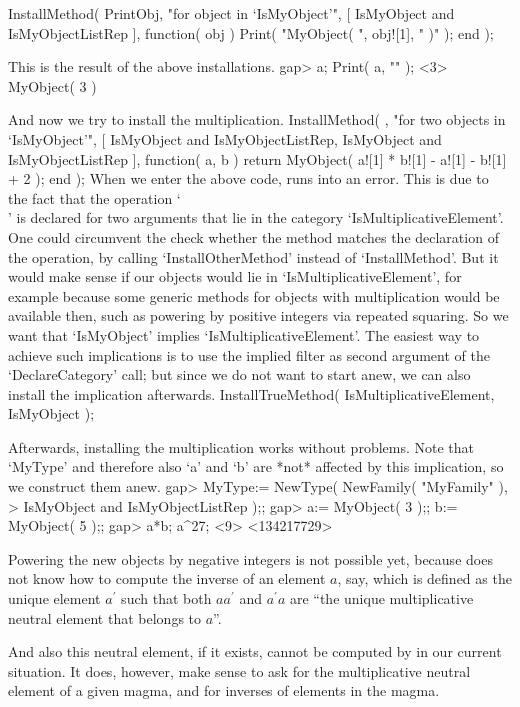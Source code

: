 InstallMethod( PrintObj,
    "for object in `IsMyObject'",
    [ IsMyObject and IsMyObjectListRep ],
    function( obj )
    Print( "MyObject( ", obj![1], " )" );
    end );
\endtt

This is the result of the above installations.
\begintt
gap> a; Print( a, "\n" );
<3>
MyObject( 3 )
\endtt

And now we try to install the multiplication.
\begintt
InstallMethod( \*,
    "for two objects in `IsMyObject'",
    [ IsMyObject and IsMyObjectListRep,
      IsMyObject and IsMyObjectListRep ],
    function( a, b )
    return MyObject( a![1] * b![1] - a![1] - b![1] + 2 );
    end );
\endtt
When we enter the above code, {\GAP} runs into an error.
This is due to the fact that the operation `\\\*' is declared for
two arguments that lie in the category `IsMultiplicativeElement'.
One could circumvent the check whether the method matches the
declaration of the operation, by calling `InstallOtherMethod'
instead of `InstallMethod'.
But it would make sense if our objects would lie in
`IsMultiplicativeElement', for example because some generic methods
for objects with multiplication would be available then,
such as powering by positive integers via repeated squaring.
So we want that `IsMyObject' implies `IsMultiplicativeElement'.
The easiest way to achieve such implications is to use the
implied filter as second argument of the `DeclareCategory' call;
but since we do not want to start anew,
we can also install the implication afterwards.
\begintt
InstallTrueMethod( IsMultiplicativeElement, IsMyObject );
\endtt

Afterwards, installing the multiplication works without problems.
Note that `MyType' and therefore also `a' and `b' are *not*
affected by this implication, so we construct them anew.
\begintt
gap> MyType:= NewType( NewFamily( "MyFamily" ),
>                      IsMyObject and IsMyObjectListRep );;
gap> a:= MyObject( 3 );;  b:= MyObject( 5 );;
gap> a*b;  a^27;
<9>
<134217729>
\endtt

Powering the new objects by negative integers is not possible yet,
because {\GAP} does not know how to compute the inverse of an element $a$,
say, which is defined as the unique element $a^{\prime}$ such that both
$a a^{\prime}$ and $a^{\prime} a$ are ``the unique multiplicative neutral
element that belongs to $a$''.

And also this neutral element, if it exists,
cannot be computed by {\GAP} in our current situation.
It does, however, make sense to ask for the multiplicative neutral
element of a given magma, and for inverses of elements in the magma.


